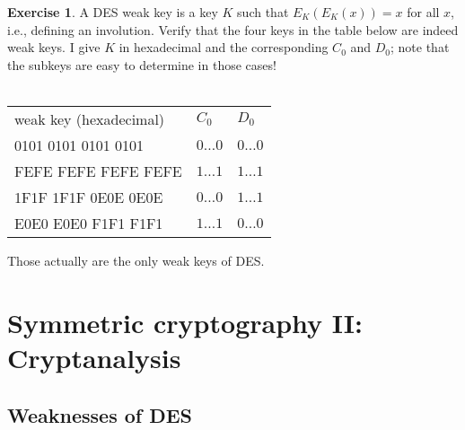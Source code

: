 \documentclass[a4paper, 11pt, openany]{book}
\numberwithin{equation}{section}
\theoremstyle{plain}
\theoremstyle{definition}
\newtheorem{exercise}   {Exercise}  [section]
\begin{document}
\begin{exercise} \label{exercise:weak_keys}
A DES weak key is a key $K$ such that $E_K(E_K(x)) = x$ for all $x$, i.e., defining
an involution.
Verify that the four keys in the table below are indeed weak keys. I give $K$ in hexadecimal and the corresponding $C_0$ and $D_0$; note that the subkeys are easy to determine in those cases!\\
~\\
\begin{tabular}{lll}
weak key (hexadecimal) & $C_0$ & $D_0$\\
0101 0101 0101 0101 & $0\dots0$ & $0\dots0$\\
FEFE FEFE FEFE FEFE & $1\dots1$ & $1\dots1$\\
1F1F 1F1F 0E0E 0E0E & $0\dots0$ & $1\dots1$\\
E0E0 E0E0 F1F1 F1F1 & $1\dots1$ & $0\dots0$
\end{tabular}

Those actually are the only weak keys of DES.
\end{exercise}









\section{Symmetric cryptography II: Cryptanalysis}
\label{sec:13}


\subsection{Weaknesses of DES}
\end{document}
